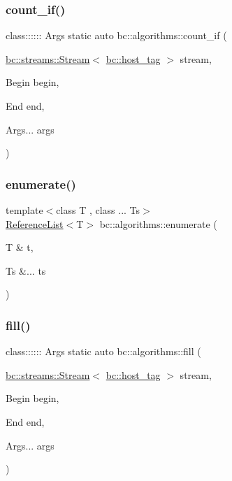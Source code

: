 \mbox{\label{namespacebc_1_1algorithms_aa3027db1b5fa7bf7ced1841792da560a}} 
\subsubsection{\texorpdfstring{count\+\_\+if()}{count\_if()}}
{\footnotesize\ttfamily class\+:::::: Args static auto bc\+::algorithms\+::count\+\_\+if (\begin{DoxyParamCaption}\item[{\hyperlink{classbc_1_1streams_1_1Stream}{bc\+::streams\+::\+Stream}$<$ \hyperlink{structbc_1_1host__tag}{bc\+::host\+\_\+tag} $>$}]{stream,  }\item[{Begin}]{begin,  }\item[{End}]{end,  }\item[{Args...}]{args }\end{DoxyParamCaption})}

\mbox{\label{namespacebc_1_1algorithms_a2f08ba7db0b64c608580cefecd06be6a}} 
\subsubsection{\texorpdfstring{enumerate()}{enumerate()}}
{\footnotesize\ttfamily template$<$class T , class ... Ts$>$ \\
\hyperlink{structbc_1_1algorithms_1_1ReferenceList}{Reference\+List}$<$T$>$ bc\+::algorithms\+::enumerate (\begin{DoxyParamCaption}\item[{T \&}]{t,  }\item[{Ts \&...}]{ts }\end{DoxyParamCaption})}

\mbox{\label{namespacebc_1_1algorithms_a0e18d09bd76be25a93a20e9e0a2f07a9}} 
\subsubsection{\texorpdfstring{fill()}{fill()}}
{\footnotesize\ttfamily class\+:::::: Args static auto bc\+::algorithms\+::fill (\begin{DoxyParamCaption}\item[{\hyperlink{classbc_1_1streams_1_1Stream}{bc\+::streams\+::\+Stream}$<$ \hyperlink{structbc_1_1host__tag}{bc\+::host\+\_\+tag} $>$}]{stream,  }\item[{Begin}]{begin,  }\item[{End}]{end,  }\item[{Args...}]{args }\end{DoxyParamCaption})}


